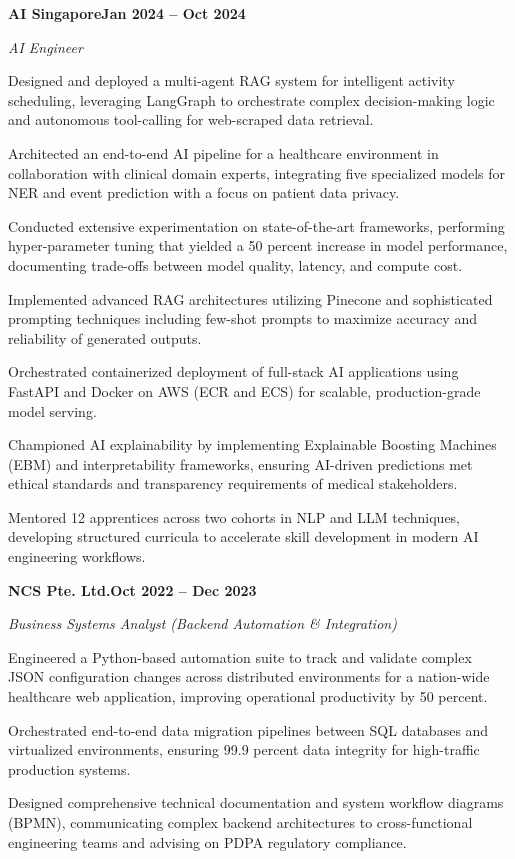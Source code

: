 \documentclass[letterpaper,10pt]{article}
\newcommand{\headingBf}[2]{\par\noindent\hspace*{10pt}\textbf{#1}\hfill\textbf{#2}}
\newcommand{\headingIt}[2]{\par\noindent\hspace*{10pt}\textit{#1}\hfill\textit{#2}}
\newenvironment{resume_list}{\vspace{-7pt}\begin{itemize}[itemsep=-2pt, parsep=1pt, leftmargin=30pt]}{\end{itemize}}
\begin{document}
  \headingBf{AI Singapore}{Jan 2024 -- Oct 2024}
  \headingIt{AI Engineer}{}
  \begin{resume_list}
    \item Designed and deployed a multi-agent RAG system for intelligent activity scheduling, leveraging LangGraph to orchestrate complex decision-making logic and autonomous tool-calling for web-scraped data retrieval.
    \item Architected an end-to-end AI pipeline for a healthcare environment in collaboration with clinical domain experts, integrating five specialized models for NER and event prediction with a focus on patient data privacy.
    \item Conducted extensive experimentation on state-of-the-art frameworks, performing hyper-parameter tuning that yielded a 50 percent increase in model performance, documenting trade-offs between model quality, latency, and compute cost.
    \item Implemented advanced RAG architectures utilizing Pinecone and sophisticated prompting techniques including few-shot prompts to maximize accuracy and reliability of generated outputs.
    \item Orchestrated containerized deployment of full-stack AI applications using FastAPI and Docker on AWS (ECR and ECS) for scalable, production-grade model serving.
    \item Championed AI explainability by implementing Explainable Boosting Machines (EBM) and interpretability frameworks, ensuring AI-driven predictions met ethical standards and transparency requirements of medical stakeholders.
    \item Mentored 12 apprentices across two cohorts in NLP and LLM techniques, developing structured curricula to accelerate skill development in modern AI engineering workflows.
  \end{resume_list}

  \headingBf{NCS Pte. Ltd.}{Oct 2022 -- Dec 2023}
  \headingIt{Business Systems Analyst (Backend Automation \& Integration)}{}
  \begin{resume_list}
    \item Engineered a Python-based automation suite to track and validate complex JSON configuration changes across distributed environments for a nation-wide healthcare web application, improving operational productivity by 50 percent.
    \item Orchestrated end-to-end data migration pipelines between SQL databases and virtualized environments, ensuring 99.9 percent data integrity for high-traffic production systems.
    \item Designed comprehensive technical documentation and system workflow diagrams (BPMN), communicating complex backend architectures to cross-functional engineering teams and advising on PDPA regulatory compliance.
  \end{resume_list}
\end{document}
